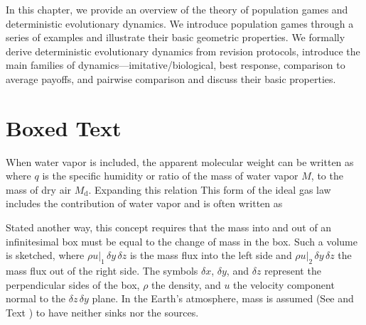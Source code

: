 \documentclass[onecolumn,authoryear]{els-mrw}
\begin{document}
\begin{table}%
\end{table}

In this chapter, we provide an overview of the theory of population games and deterministic evolutionary dynamics.  We introduce population games through a series of examples and illustrate their basic geometric properties.  We formally derive deterministic evolutionary dynamics from revision protocols, introduce the main families of dynamics---imitative/biological, best response, comparison to average payoffs, and pairwise comparison and discuss their basic properties.

\section{Boxed Text}\label{chap1:sec7}%

When water vapor is included, the apparent molecular weight can be
written as where $q$ is the specific humidity or ratio of the mass of water vapor
$M$, to the mass of dry air $M_{\mathrm{d}}$. Expanding this relation This form of the ideal gas law includes the contribution of water
vapor and is often written as

Stated another way, this concept requires that the
mass into and out of an infinitesimal box must be equal to the change
of mass in the box. Such a volume is sketched,
where $\rho u|_1 \, \delta y \, \delta z$ is the mass flux into the left side
and $\rho u|_2 \,
 \delta y \, \delta z$ the mass flux out of the right side. The
symbols $\delta x$, $\delta y$, and $\delta z$ represent the
perpendicular sides of the box,  $\rho$ the density, and $u$ the velocity
component normal to the $\delta z \, \delta y$ plane.
In the Earth's atmosphere, mass is assumed (See  and Text ) to have neither sinks nor the
sources.
\end{document}

